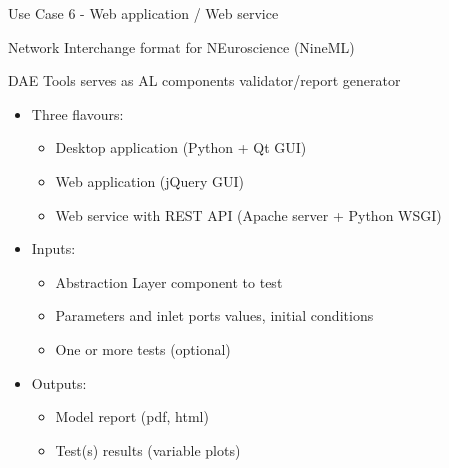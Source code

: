 \documentclass[compress,newPxFont,sthlmFooter]{beamer}
\begin{document}
\begin{frame}[plain]{Use Case 6 - Web application / Web service}
    \begin{center}
        \alert{Network Interchange format for NEuroscience (NineML)}
    \end{center}   
    \small{DAE Tools serves as \alert{AL components validator/report generator}}
    
    \begin{itemize}
        \item Three flavours:
        \begin{itemize}
            \item \alert{Desktop application} (Python + Qt GUI)
            \item \alert{Web application} (jQuery GUI)
            \item \alert{Web service} with REST API (Apache server + Python WSGI)
        \end{itemize}
        \item Inputs:
            \begin{itemize}
                \item Abstraction Layer component to test
                \item Parameters and inlet ports values, initial conditions
                \item One or more tests (optional)
            \end{itemize}
        \item Outputs:
            \begin{itemize}
                \item Model report (pdf, html)
                \item Test(s) results (variable plots)
            \end{itemize}
    \end{itemize}
\end{frame}
\end{document}

